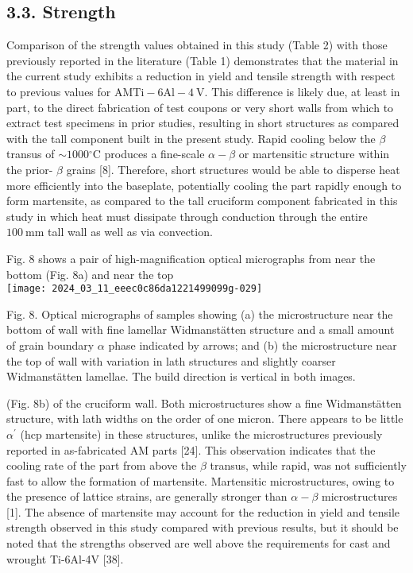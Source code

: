 \documentclass[10pt]{article}
\begin{document}
\subsection*{3.3. Strength}
Comparison of the strength values obtained in this study (Table 2) with those previously reported in the literature (Table 1) demonstrates that the material in the current study exhibits a reduction in yield and tensile strength with respect to previous values for $\mathrm{AM} \mathrm{Ti}-6 \mathrm{Al}-4 \mathrm{~V}$. This difference is likely due, at least in part, to the direct fabrication of test coupons or very short walls from which to extract test specimens in prior studies, resulting in short structures as compared with the tall component built in the present study. Rapid cooling below the $\beta$ transus of $\sim 1000{ }^{\circ} \mathrm{C}$ produces a fine-scale $\alpha-\beta$ or martensitic structure within the prior- $\beta$ grains [8]. Therefore, short structures would be able to disperse heat more efficiently into the baseplate, potentially cooling the part rapidly enough to form martensite, as compared to the tall cruciform component fabricated in this study in which heat must dissipate through conduction through the entire $100 \mathrm{~mm}$ tall wall as well as via convection.

Fig. 8 shows a pair of high-magnification optical micrographs from near the bottom (Fig. 8a) and near the top\\
\texttt{[image: 2024\_03\_11\_eeec0c86da1221499099g-029]}

Fig. 8. Optical micrographs of samples showing (a) the microstructure near the bottom of wall with fine lamellar Widmanstätten structure and a small amount of grain boundary $\alpha$ phase indicated by arrows; and (b) the microstructure near the top of wall with variation in lath structures and slightly coarser Widmanstätten lamellae. The build direction is vertical in both images.

(Fig. 8b) of the cruciform wall. Both microstructures show a fine Widmanstätten structure, with lath widths on the order of one micron. There appears to be little $\alpha^{\prime}$ (hcp martensite) in these structures, unlike the microstructures previously reported in as-fabricated AM parts [24]. This observation indicates that the cooling rate of the part from above the $\beta$ transus, while rapid, was not sufficiently fast to allow the formation of martensite. Martensitic microstructures, owing to the presence of lattice strains, are generally stronger than $\alpha-\beta$ microstructures [1]. The absence of martensite may account for the reduction in yield and tensile strength observed in this study compared with previous results, but it should be noted that the strengths observed are well above the requirements for cast and wrought Ti-6Al-4V [38].
\end{document}
